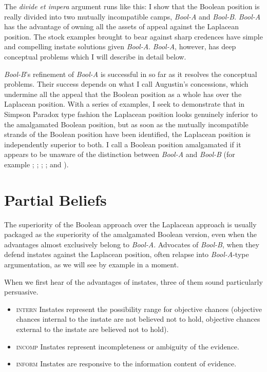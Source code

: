 \documentclass[11pt]{article}
\newcommand{\anderson}[0]{\textit{Bool-A}}
\newcommand{\augustin}[0]{\textit{Bool-B}}
\begin{document}
The \emph{divide et impera} argument runs like this: I show that the
Boolean position is really divided into two mutually incompatible
camps, {\anderson} and {\augustin}. {\anderson} has the advantage of
owning all the assets of appeal against the Laplacean position. The
stock examples brought to bear against sharp credences have simple and
compelling instate solutions given {\anderson}. {\anderson}, however,
has deep conceptual problems which I will describe in detail below.

{\augustin}'s refinement of {\anderson} is successful in so far as it
resolves the conceptual problems. Their success depends on what I call
Augustin's concessions, which undermine all the appeal that the
Boolean position as a whole has over the Laplacean position. With a
series of examples, I seek to demonstrate that in Simpson Paradox type
fashion the Laplacean position looks genuinely inferior to the
amalgamated Boolean position, but as soon as the mutually incompatible
strands of the Boolean position have been identified, the Laplacean
position is independently superior to both. I call a Boolean position
amalgamated if it appears to be unaware of the distinction between
{\anderson} and {\augustin} (for example ;
; ;
; and ).

\section{Partial Beliefs}
\label{amalgamated}

The superiority of the Boolean approach over the Laplacean
approach is usually packaged as the superiority of the amalgamated
Boolean version, even when the advantages almost exclusively belong to
{\anderson}. Advocates of {\augustin}, when they defend instates
against the Laplacean position, often relapse into {\anderson}-type
argumentation, as we will see by example in a moment.

When we first hear of the advantages of instates, three of
them sound particularly persuasive.

\begin{itemize}
\item \textsc{intern} Instates represent the possibility range for
  objective chances (objective chances internal to the instate are not
  believed not to hold, objective chances external to the instate are
  believed not to hold).
\item \textsc{incomp} Instates represent incompleteness or
  ambiguity of the evidence.
\item \textsc{inform} Instates are responsive to the information
  content of evidence.
\end{itemize}
\end{document}
